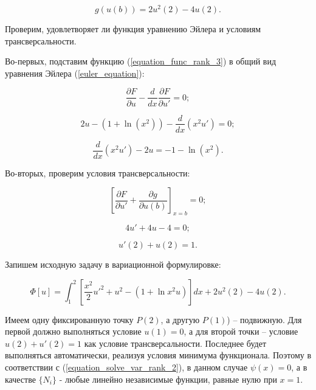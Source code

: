 \documentclass{article}
\begin{document}
\begin{displaymath}
	g(u(b)) = 2u^2(2) - 4u(2).
\end{displaymath}

\noindent Проверим, удовлетворяет ли функция уравнению Эйлера и условиям трансверсальности.

Во-первых, подставим функцию (\ref{equation_func_rank_3}) в общий вид уравнения Эйлера (\ref{euler_equation}):

\begin{displaymath}
	\frac{\partial F}{\partial u} - \frac{d}{dx} \frac{\partial F}{\partial u'} = 0;
\end{displaymath}

\begin{displaymath}
	2u - (1 + \ln(x^2)) - \frac{d}{dx}(x^2 u') = 0;
\end{displaymath}

\begin{displaymath}
	\frac{d}{dx}(x^2 u') - 2u = -1 - \ln(x^2).
\end{displaymath}

Во-вторых, проверим условия трансверсальности:

\begin{displaymath}
	\left[ \frac{\partial F}{\partial u'} + \frac{\partial g}{\partial u(b)} \right] _{x=b} = 0;
\end{displaymath}

\begin{displaymath}
	4u' + 4u - 4 = 0;
\end{displaymath}

\begin{displaymath}
	u'(2) + u(2) = 1.
\end{displaymath}

Запишем исходную задачу в вариационной формулировке:

\begin{displaymath}
	\Phi[u] = \int_{1}^{2} \left[ \frac{x^2}{2}u'^2 + u^2 - (1 + \ln{x^2}u) \right] dx + 2u^2(2) - 4u(2).
\end{displaymath}

Имеем одну фиксированную точку $P(2)$, а другую $P(1)$) – подвижную. Для первой должно выполняться условие $u(1) = 0$, а для второй точки – условие $u(2) + u'(2) = 1$ как условие трансверсальности. Последнее будет выполняться автоматически, реализуя условия минимума функционала. Поэтому в соответствии с (\ref{equation_solve_var_rank_2}), в данном случае $\psi(x) = 0$, а в качестве $\lbrace N_{i} \rbrace$ - любые линейно независимые функции, равные нулю при $x = 1$.
\end{document}
